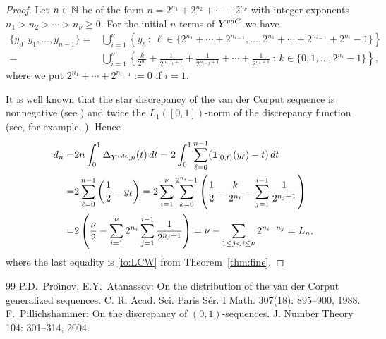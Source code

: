 \documentclass[10pt,a4paper]{amsart}
\newcommand{\NN}{{\Bbb N}}
\newcommand{\rd}{\,{\rm d}}
\begin{document}
\begin{proof}
Let $n \in \NN$ be of the form $n=2^{n_1}+2^{n_2}+\cdots+2^{n_{\nu}}$ with integer exponents $n_1 > n_2 > \cdots > n_{\nu}\ge 0$. For the initial $n$ terms of $Y^{\rm vdC}$ we have 
\begin{align*}
\{y_0,y_1,\ldots,y_{n-1}\} = & \bigcup_{i=1}^{\nu}\left\{y_{\ell}\ : \ \ell \in \{2^{n_1}+\cdots+2^{n_{i-1}},\ldots, 2^{n_1}+\cdots+2^{n_{i-1}}+2^{n_i}-1\}\right\}\\
= & \bigcup_{i=1}^{\nu} \left\{\frac{k}{2^{n_i}}+\frac{1}{2^{n_{i-1}+1}}+\frac{1}{2^{n_{i-2}+1}}+\cdots +\frac{1}{2^{n_1+1}} \ : \ k \in \{0,1,\ldots,2^{n_i}-1\}\right\},
\end{align*}
where we put $2^{n_1}+\cdots+2^{n_{i-1}}:=0$ if $i=1$.

It is well known that the star discrepancy of the van der Corput sequence is nonnegative (see \cite[Remark~3]{p04}) and twice the $L_1([0,1])$-norm of the discrepancy function (see, for example, \cite{PA}). Hence 
\begin{align}\label{stl1}
d_n = & 2 n  \int_0^1 \Delta_{Y^{\rm vdc},n}(t) \rd t = 2 \int_0^1 \sum_{\ell=0}^{n-1} (\boldsymbol{1}_{[0,t)}(y_{\ell}) -t) \rd t\\
= & 2 \sum_{\ell=0}^{n-1} \left(\frac{1}{2}-y_{\ell}\right) = 2 \sum_{i=1}^{\nu} \sum_{k=0}^{2^{n_i}-1} \left(\frac{1}{2}-\frac{k}{2^{n_i}}- \sum_{j=1}^{i-1} \frac{1}{2^{n_j+1}}\right)\nonumber\\
= & 2 \left(\frac{\nu}{2}-\sum_{i=1}^{\nu}2^{n_i} \sum_{j=1}^{i-1} \frac{1}{2^{n_j+1}} \right) = \nu-\sum_{1\le j < i \le \nu}2^{n_i-n_j} =L_n,\nonumber
\end{align}
where the last equality is \eqref{fo:LCW} from Theorem~\ref{thm:fine}.
\end{proof}

\begin{thebibliography}{99}
 P.D.~Pro\u{\i}nov, E.Y.~Atanassov: On the distribution of the van der Corput generalized sequences. C. R. Acad. Sci. Paris S\'er. I Math. 307(18): 895--900, 1988. %
 F.~Pillichshammer: On the discrepancy of $(0,1)$-sequences. J. Number Theory 104: 301--314, 2004. %
\end{thebibliography}
\end{document}
